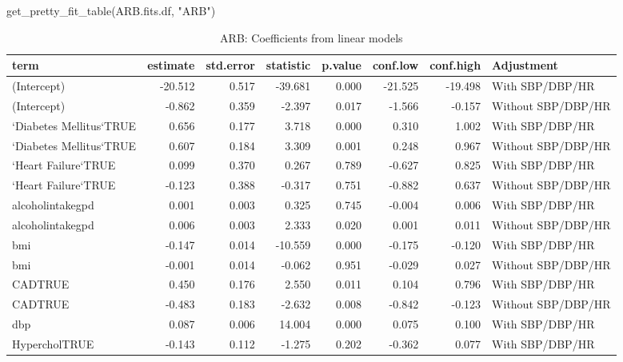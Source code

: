 \documentclass[
]{article}
\newenvironment{Shaded}{\begin{snugshade}}{\end{snugshade}}
\newcommand{\FunctionTok}[1]{\textcolor[rgb]{0.00,0.00,0.00}{#1}}
\newcommand{\NormalTok}[1]{#1}
\newcommand{\StringTok}[1]{\textcolor[rgb]{0.31,0.60,0.02}{#1}}
\begin{document}
\begin{Shaded}
\begin{Highlighting}[]
\FunctionTok{get\_pretty\_fit\_table}\NormalTok{(ARB.fits.df, }\StringTok{"ARB"}\NormalTok{)}
\end{Highlighting}
\end{Shaded}

\begin{table}

\caption{\label{tab:ARB-fit-table}ARB: Coefficients from linear models}
\centering
\begin{tabular}[t]{l|r|r|r|r|r|r|l}
\hline
term & estimate & std.error & statistic & p.value & conf.low & conf.high & Adjustment\\
\hline
(Intercept) & -20.512 & 0.517 & -39.681 & 0.000 & -21.525 & -19.498 & With SBP/DBP/HR\\
\hline
(Intercept) & -0.862 & 0.359 & -2.397 & 0.017 & -1.566 & -0.157 & Without SBP/DBP/HR\\
\hline
`Diabetes Mellitus`TRUE & 0.656 & 0.177 & 3.718 & 0.000 & 0.310 & 1.002 & With SBP/DBP/HR\\
\hline
`Diabetes Mellitus`TRUE & 0.607 & 0.184 & 3.309 & 0.001 & 0.248 & 0.967 & Without SBP/DBP/HR\\
\hline
`Heart Failure`TRUE & 0.099 & 0.370 & 0.267 & 0.789 & -0.627 & 0.825 & With SBP/DBP/HR\\
\hline
`Heart Failure`TRUE & -0.123 & 0.388 & -0.317 & 0.751 & -0.882 & 0.637 & Without SBP/DBP/HR\\
\hline
alcoholintakegpd & 0.001 & 0.003 & 0.325 & 0.745 & -0.004 & 0.006 & With SBP/DBP/HR\\
\hline
alcoholintakegpd & 0.006 & 0.003 & 2.333 & 0.020 & 0.001 & 0.011 & Without SBP/DBP/HR\\
\hline
bmi & -0.147 & 0.014 & -10.559 & 0.000 & -0.175 & -0.120 & With SBP/DBP/HR\\
\hline
bmi & -0.001 & 0.014 & -0.062 & 0.951 & -0.029 & 0.027 & Without SBP/DBP/HR\\
\hline
CADTRUE & 0.450 & 0.176 & 2.550 & 0.011 & 0.104 & 0.796 & With SBP/DBP/HR\\
\hline
CADTRUE & -0.483 & 0.183 & -2.632 & 0.008 & -0.842 & -0.123 & Without SBP/DBP/HR\\
\hline
dbp & 0.087 & 0.006 & 14.004 & 0.000 & 0.075 & 0.100 & With SBP/DBP/HR\\
\hline
HypercholTRUE & -0.143 & 0.112 & -1.275 & 0.202 & -0.362 & 0.077 & With SBP/DBP/HR\\

\end{tabular}
\end{table}
\end{document}
